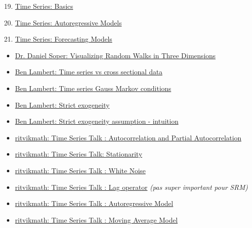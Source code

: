 \documentclass[12pt, titlepage, french]{report}
\begin{document}
\begin{ASM_chapter}
\begin{enumerate}
  \setcounter{enumi}{18}
	\item	\hyperref[timeseries19]{Time Series: Basics}
	\item	\hyperref[timeseries20]{Time Series: Autoregressive Models}
	\item	\hyperref[timeseries21]{Time Series: Forecasting Models}
\end{enumerate}
\end{ASM_chapter}

\begin{YTB_vids}
\begin{itemize}
	\item	\href{https://www.youtube.com/watch?v=7A83lXbs6Ik}{Dr. Daniel Soper: Visualizing Random Walks in Three Dimensions}
	\item	\href{https://www.youtube.com/watch?v=-gmlyRRscXo}{Ben Lambert: Time series vs cross sectional data}
	\item	\href{https://www.youtube.com/watch?v=bWo_ka37szw&list=PLvo9ZnEQG5oXC-cg8ecXr6SJZWprEL1UC&index=3}{Ben Lambert: Time series Gauss Markov conditions}
	\item	\href{https://www.youtube.com/watch?v=LgIOgb-6mYA&list=PLvo9ZnEQG5oXC-cg8ecXr6SJZWprEL1UC&index=3}{Ben Lambert: Strict exogeneity}
	\item	\href{https://www.youtube.com/watch?v=a7_3qX67e7c&list=PLvo9ZnEQG5oXC-cg8ecXr6SJZWprEL1UC&index=4}{Ben Lambert: Strict exogeneity assumption - intuition}
	\item	\href{https://www.youtube.com/watch?v=DeORzP0go5I&list=PLvcbYUQ5t0UHOLnBzl46_Q6QKtFgfMGc3&index=14}{ritvikmath: Time Series Talk : Autocorrelation and Partial Autocorrelation}
	\item	\href{https://www.youtube.com/watch?v=oY-j2Wof51c&list=PLvcbYUQ5t0UHOLnBzl46_Q6QKtFgfMGc3&index=6}{ritvikmath: Time Series Talk: Stationarity}
	\item	\href{https://www.youtube.com/watch?v=cr4zIXAmSRI}{ritvikmath: Time Series Talk : White Noise}
	\item	\href{https://www.youtube.com/watch?v=VPNijQ2L3XM&list=PLvcbYUQ5t0UHOLnBzl46_Q6QKtFgfMGc3&index=4}{ritvikmath: Time Series Talk : Lag operator} \textit{(pas super important pour SRM)}
	\item	\href{https://www.youtube.com/watch?v=5-2C4eO4cPQ}{ritvikmath: Time Series Talk : Autoregressive Model}
	\item	\href{https://www.youtube.com/watch?v=voryLhxiPzE&list=PLvcbYUQ5t0UHOLnBzl46_Q6QKtFgfMGc3&index=6}{ritvikmath: Time Series Talk : Moving Average Model}

\end{itemize}
\end{YTB_vids}
\end{document}
